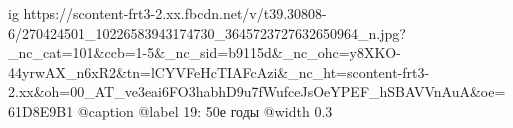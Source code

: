  
 
 
 
 

\ifcmt
  ig https://scontent-frt3-2.xx.fbcdn.net/v/t39.30808-6/270424501_10226583943174730_3645723727632650964_n.jpg?_nc_cat=101&ccb=1-5&_nc_sid=b9115d&_nc_ohc=y8XKO-44yrwAX_n6xR2&tn=lCYVFeHcTIAFcAzi&_nc_ht=scontent-frt3-2.xx&oh=00_AT_ve3eai6FO3habhD9u7fWufceJsOeYPEF_hSBAVVnAuA&oe=61D8E9B1
	@caption @label 19: 50е годы
  @width 0.3
\fi
